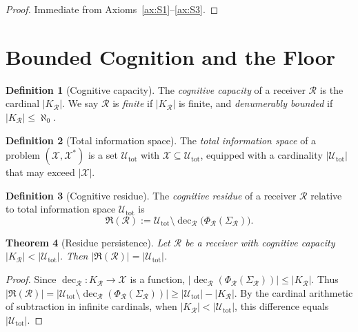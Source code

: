 \documentclass[twocolumn,11pt,a4paper]{article}
\theoremstyle{thmstyle}
\newtheorem{theorem}{Theorem}[section]
\theoremstyle{thmstyle}
\theoremstyle{definition}
\newtheorem{definition}[theorem]{Definition}
\theoremstyle{remark}
\DeclareMathOperator{\dec}{dec}
\newcommand{\Cands}{\mathcal{X}}
\newcommand{\Truth}{\mathcal{X}^{*}}
\newcommand{\Sub}{\mathcal{U}}
\newcommand{\receiver}{\mathcal{R}}
\newcommand{\Resi}{\mathfrak{R}}
\begin{document}
\begin{proof}
Immediate from Axioms~\ref{ax:S1}--\ref{ax:S3}.
\end{proof}

\section{Bounded Cognition and the Floor}
\label{sec:bounded-cognition}

\begin{definition}[Cognitive capacity]\label{def:cog-cap}
The \emph{cognitive capacity} of a receiver $\receiver$
is the cardinal $|K_{\receiver}|$.  We say $\receiver$ is
\emph{finite} if $|K_{\receiver}|$ is finite, and
\emph{denumerably bounded} if $|K_{\receiver}| \leq \aleph_{0}$.
\end{definition}

\begin{definition}[Total information space]\label{def:total-info}
The \emph{total information space} of a problem
$(\Cands, \Truth)$ is a set $\Sub_{\mathrm{tot}}$ with
$\Cands \subseteq \Sub_{\mathrm{tot}}$, equipped with a
cardinality $|\Sub_{\mathrm{tot}}|$ that may exceed
$|\Cands|$.
\end{definition}

\begin{definition}[Cognitive residue]\label{def:residue}
The \emph{cognitive residue} of a receiver $\receiver$
relative to total information space $\Sub_{\mathrm{tot}}$ is
\[
\Resi(\receiver) := \Sub_{\mathrm{tot}} \setminus
   \dec_{\receiver}\bigl(\Phi_{\receiver}(\Sigma_{\receiver})\bigr).
\]
\end{definition}

\begin{theorem}[Residue persistence]\label{thm:residue-persistence}
Let $\receiver$ be a receiver with cognitive capacity
$|K_{\receiver}| < |\Sub_{\mathrm{tot}}|$.  Then
$|\Resi(\receiver)| = |\Sub_{\mathrm{tot}}|$.
\end{theorem}

\begin{proof}
Since $\dec_{\receiver}: K_{\receiver} \to \Cands$ is a
function, $|\dec_{\receiver}(\Phi_{\receiver}(\Sigma_{\receiver}))|
\leq |K_{\receiver}|$.  Thus
$|\Resi(\receiver)| = |\Sub_{\mathrm{tot}} \setminus
\dec_{\receiver}(\Phi_{\receiver}(\Sigma_{\receiver}))|
\geq |\Sub_{\mathrm{tot}}| - |K_{\receiver}|$.
By the cardinal arithmetic of subtraction in infinite
cardinals, when $|K_{\receiver}| < |\Sub_{\mathrm{tot}}|$,
this difference equals $|\Sub_{\mathrm{tot}}|$.
\end{proof}
\end{document}
